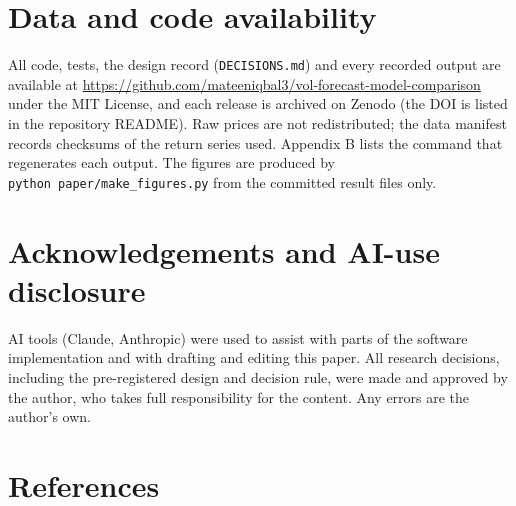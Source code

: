 \documentclass[11pt]{article}
\begin{document}
\hypertarget{data-and-code-availability}{%
\section*{Data and code availability}\label{data-and-code-availability}}

All code, tests, the design record (\texttt{DECISIONS.md}) and every recorded
output are available at
\url{https://github.com/mateeniqbal3/vol-forecast-model-comparison} under the
MIT License, and each release is archived on Zenodo (the DOI is listed in
the repository README). Raw prices are not redistributed; the data manifest
records checksums of the return series used. Appendix B lists the command
that regenerates each output. The figures are produced by
\texttt{python\ paper/make\_figures.py} from the committed result files only.

\hypertarget{acknowledgements-and-ai-use-disclosure}{%
\section*{Acknowledgements and AI-use disclosure}\label{acknowledgements-and-ai-use-disclosure}}

AI tools (Claude, Anthropic) were used to assist with parts of the
software implementation and with drafting and editing this paper. All
research decisions, including the pre-registered design and decision rule,
were made and approved by the author, who takes full responsibility for
the content. Any errors are the author's own.

\hypertarget{references}{%
\section*{References}\label{references}}
\end{document}
